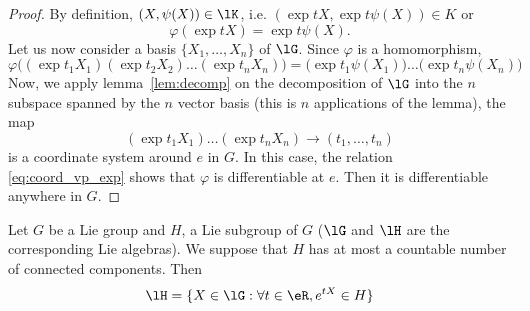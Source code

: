 \begin{proof}
By definition, $(X,\psi(X))\in\lK$, i.e. $(\exp tX,\exp t\psi(X))\in K$ or
\begin{equation}
  \varphi(\exp tX)=\exp t\psi(X).
\end{equation}
Let us now consider a basis $\{X_1,\ldots,X_n\}$ of $\lG$. Since $\varphi$ is a homomorphism,
\begin{equation}\label{eq:coord_vp_exp}
   \varphi\big((\exp t_1X_1)(\exp t_2X_2)\ldots(\exp t_nX_n)\big)
     =\big(\exp t_1\psi(X_1)\big)\ldots\big( \exp t_n\psi(X_n) \big)
\end{equation}
Now, we apply lemma~\ref{lem:decomp} on the decomposition of $\lG$ into the $n$ subspace spanned by the $n$ vector basis (this is $n$ applications of the lemma), the map
\[
  (\exp t_1X_1)\ldots(\exp t_nX_n)\to (t_1,\ldots,t_n)
\]
is a coordinate system around $e$ in $G$. In this case, the relation \eqref{eq:coord_vp_exp} shows that $\varphi$ is differentiable at $e$. Then it is differentiable anywhere in $G$.
\end{proof}


\begin{proposition}
Let $G$ be a Lie group and $H$, a Lie subgroup of $G$ ($\lG$ and $\lH$ are the corresponding Lie algebras). We suppose that $H$ has at most a countable number of connected components. Then
\begin{equation}
  \lH=\{ X\in\lG:\forall t\in\eR,e^{tX}\in H \}
\end{equation}
\end{proposition}

